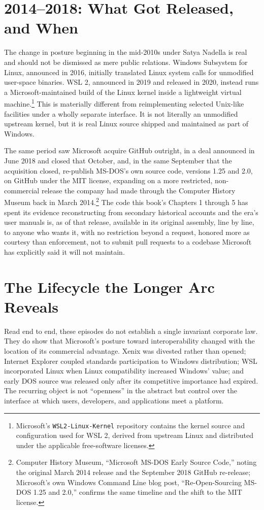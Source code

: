 \documentclass[11pt]{book}
\begin{document}
\section{2014--2018: What Got Released, and When}

The change in posture beginning in the mid-2010s under Satya Nadella is real and should not be dismissed as mere public relations. Windows Subsystem for Linux, announced in 2016, initially translated Linux system calls for unmodified user-space binaries. WSL 2, announced in 2019 and released in 2020, instead runs a Microsoft-maintained build of the Linux kernel inside a lightweight virtual machine.\footnote{Microsoft's \texttt{WSL2-Linux-Kernel} repository contains the kernel source and configuration used for WSL 2, derived from upstream Linux and distributed under the applicable free-software licenses.} This is materially different from reimplementing selected Unix-like facilities under a wholly separate interface. It is not literally an unmodified upstream kernel, but it is real Linux source shipped and maintained as part of Windows.

The same period saw Microsoft acquire GitHub outright, in a deal announced in June 2018 and closed that October, and, in the same September that the acquisition closed, re-publish MS-DOS's own source code, versions 1.25 and 2.0, on GitHub under the MIT license, expanding on a more restricted, non-commercial release the company had made through the Computer History Museum back in March 2014.\footnote{Computer History Museum, \enquote{Microsoft MS-DOS Early Source Code,} noting the original March 2014 release and the September 2018 GitHub re-release; Microsoft's own Windows Command Line blog post, \enquote{Re-Open-Sourcing MS-DOS 1.25 and 2.0,} confirms the same timeline and the shift to the MIT license.} The code this book's Chapters 1 through 5 has spent its evidence reconstructing from secondary historical accounts and the era's user manuals is, as of that release, available in its original assembly, line by line, to anyone who wants it, with no restriction beyond a request, honored more as courtesy than enforcement, not to submit pull requests to a codebase Microsoft has explicitly said it will not maintain.

\section{The Lifecycle the Longer Arc Reveals}

Read end to end, these episodes do not establish a single invariant corporate law. They do show that Microsoft's posture toward interoperability changed with the location of its commercial advantage. Xenix was divested rather than opened; Internet Explorer coupled standards participation to Windows distribution; WSL incorporated Linux when Linux compatibility increased Windows' value; and early DOS source was released only after its competitive importance had expired. The recurring object is not ``openness'' in the abstract but control over the interface at which users, developers, and applications meet a platform.
\end{document}
